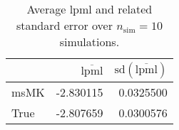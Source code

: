 \begin{table}[H]

\caption{Average lpml and related standard error over $n_{\text{sim}} = 10$ simulations.}
\centering
\begin{tabular}[t]{lrr}
\toprule
  & $\overbar{\text{lpml}}$ & $\text{sd}(\overbar{\text{lpml}})$\\
\midrule
msMK & -2.830115 & 0.0325500\\
True & -2.807659 & 0.0300576\\
\bottomrule
\end{tabular}
\end{table}
